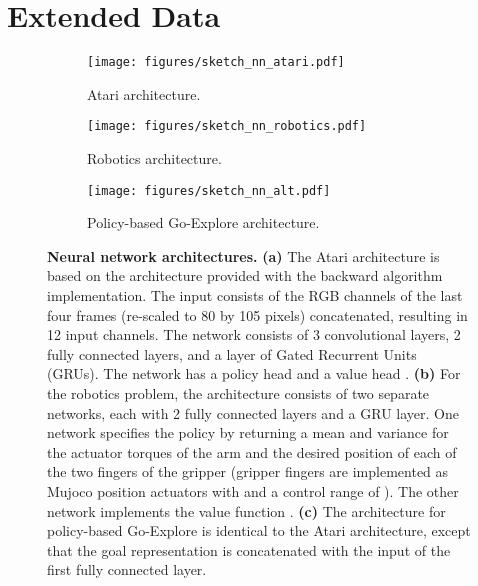 \documentclass{nature}
\renewcommand*{\cite}[1]{\supercite{#1}}
\begin{document}
\section*{Extended Data}
\FloatBarrier

\renewcommand{\figurename}{Extended Data Figure}
\renewcommand{\tablename}{Extended Data Table}
\setcounter{figure}{0}
\setcounter{table}{0}


\begin{figure}[ht!]
    \begin{subfigure}[]{\textwidth}
            \centering
            \texttt{[image: figures/sketch\_nn\_atari.pdf]}
            \caption{Atari architecture.}
        \label{efig:nn_atari}
    \end{subfigure}
    \begin{subfigure}[]{\textwidth}
            \centering
            \texttt{[image: figures/sketch\_nn\_robotics.pdf]}
            \caption{Robotics architecture.}
        \label{efig:nn_robotics}
    \end{subfigure}
    \begin{subfigure}[]{\textwidth}
            \centering
            \texttt{[image: figures/sketch\_nn\_alt.pdf]}
            \caption{Policy-based Go-Explore architecture.}
    \end{subfigure}
    \caption{\textbf{Neural network architectures.} \textbf{(a)} The Atari architecture is based on the architecture provided with the backward algorithm implementation. The input consists of the RGB channels of the last four frames (re-scaled to 80 by 105 pixels) concatenated, resulting in 12 input channels. The network consists of 3 convolutional layers, 2 fully connected layers, and a layer of Gated Recurrent Units (GRUs)\cite{cho2014properties}. The network has a policy head  and a value head . \textbf{(b)} For the robotics problem, the architecture consists of two separate networks, each with 2 fully connected layers and a GRU layer. One network specifies the policy  by returning a mean  and variance  for the actuator torques of the arm and the desired position of each of the two fingers of the gripper (gripper fingers are implemented as Mujoco position actuators\cite{todorov2012mujoco} with  and a control range of ). The other network implements the value function . \textbf{(c)} The architecture for policy-based Go-Explore is identical to the Atari architecture, except that the goal representation  is concatenated with the input of the first fully connected layer.}
    \label{efig:nn_architectures}
\end{figure}
\end{document}
